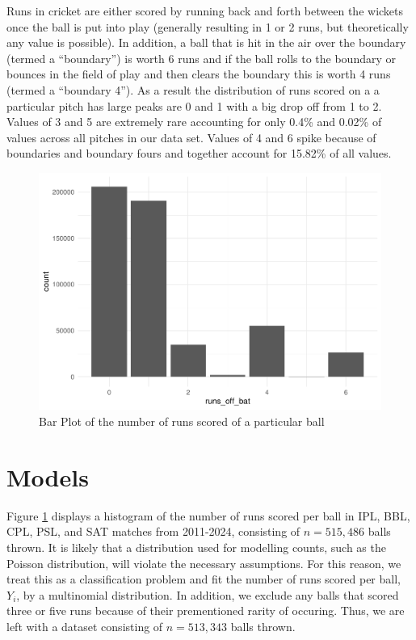 \documentclass[
  12pt,
]{article}
\begin{document}
Runs in cricket are either scored by running back and forth between the
wickets once the ball is put into play (generally resulting in 1 or 2
runs, but theoretically any value is possible). In addition, a ball that
is hit in the air over the boundary (termed a ``boundary'') is worth 6
runs and if the ball rolls to the boundary or bounces in the field of
play and then clears the boundary this is worth 4 runs (termed a
``boundary 4''). As a result the distribution of runs scored on a a
particular pitch has large peaks are 0 and 1 with a big drop off from 1
to 2. Values of 3 and 5 are extremely rare accounting for only 0.4\% and
0.02\% of values across all pitches in our data set. Values of 4 and 6
spike because of boundaries and boundary fours and together account for
15.82\% of all values.

\begin{figure}

{\centering \includegraphics{paper_files/figure-latex/bar-1} 

}

\caption{Bar Plot of the number of runs scored of a particular ball}\label{fig:bar}
\end{figure}

\hypertarget{sec:models}{%
\section{Models}\label{sec:models}}

Figure \ref{fig:bar} displays a histogram of the number of runs scored
per ball in IPL, BBL, CPL, PSL, and SAT matches from 2011-2024,
consisting of \(n = 515,486\) balls thrown. It is likely that a
distribution used for modelling counts, such as the Poisson
distribution, will violate the necessary assumptions. For this reason,
we treat this as a classification problem and fit the number of runs
scored per ball, \(Y_i\), by a multinomial distribution. In addition, we
exclude any balls that scored three or five runs because of their
prementioned rarity of occuring. Thus, we are left with a dataset
consisting of \(n = 513,343\) balls thrown.
\end{document}
